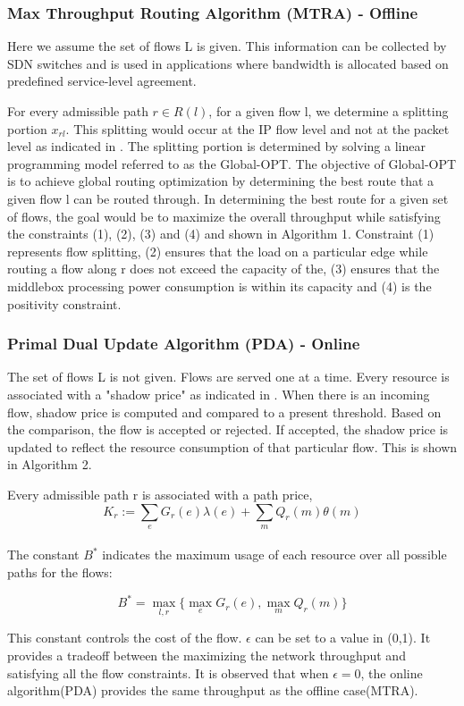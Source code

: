 \subsubsection{Max Throughput Routing Algorithm (MTRA) - Offline}
Here we assume the set of flows L is given. This information can be collected by SDN switches and is used in applications where bandwidth is allocated based on predefined service-level agreement.

For every admissible path $r \in R(l)$, for a given flow l, we determine a splitting portion $x_{rl}$. This splitting would occur at the IP flow level and not at the packet level as indicated in \cite{ref:paper1}. The splitting portion is determined by solving a linear programming model referred to as the Global-OPT. The objective of Global-OPT is to achieve global routing optimization by determining the best route that a given flow l can be routed through. In determining the best route for a given set of flows, the goal would be to maximize the overall throughput while satisfying the constraints (1), (2), (3) and (4) and shown in Algorithm 1. Constraint (1) represents flow splitting, (2) ensures that the load on a particular edge while routing a flow along r does not exceed the capacity of the, (3) ensures that the middlebox processing power consumption is within its capacity and (4) is the positivity constraint.

\subsubsection{Primal Dual Update Algorithm (PDA) - Online}
The set of flows L is not given. Flows are served one at a time. Every resource is associated with a "shadow price" as indicated in \cite{ref:paper1}. When there is an incoming flow, shadow price is computed and compared to a present threshold. Based on the comparison, the flow is accepted or rejected. If accepted, the shadow price is updated to reflect the resource consumption of that particular flow. This is shown in Algorithm 2. 

Every admissible path r is associated with a path price,\\
$$K_r := \sum_{e}G_r(e)\lambda(e) + \sum_{m}Q_r(m)\theta(m)$$\\
The constant $B^*$ indicates the maximum usage of each resource over all possible paths for the flows:

$$B^* = \max_{l,r}\{\max_{e}G_r(e), \max_{m}Q_r(m)\}$$

This constant controls the cost of the flow. $\epsilon$ can be set to a value in (0,1). It provides a tradeoff between the maximizing the network throughput and satisfying all the flow constraints. It is observed that when $\epsilon = 0$, the online algorithm(PDA) provides the same throughput as the offline case(MTRA). 

